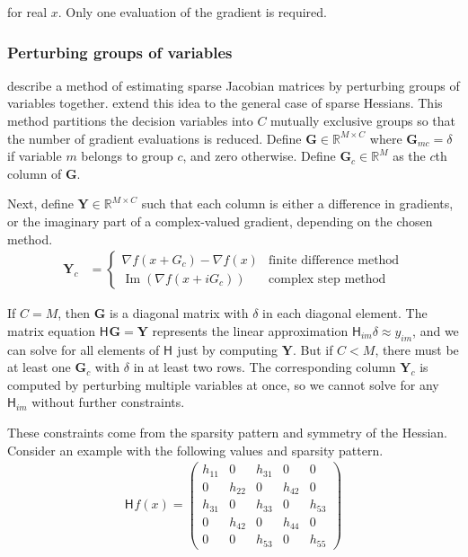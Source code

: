 \documentclass[jss]{jss}\usepackage[]{graphicx}\usepackage[]{color}
\newcommand{\hess}[2]{\mathsf{H}_{#1}#2}
\newcommand{\Mat}[1]{\mathbf{#1}}
\newcommand{\Real}[1]{\mathbb{R}^{#1}}
\DeclareMathOperator{\Imag}{Im}
\begin{document}
for real $x$.  Only one evaluation of the gradient is required.

\subsubsection[Perturbing groups of variables]{Perturbing groups of variables}

 describe a method of estimating sparse
Jacobian matrices by perturbing groups of variables together.
 extend this idea to the
general case of sparse Hessians.  This method partitions
the decision variables into $C$ mutually exclusive groups so that the number of gradient
evaluations is reduced.  Define $\Mat{G}\in\Real{M\times C}$ where $\Mat{G}_{mc}=\delta$ if variable $m$ belongs to group $c$, and zero
otherwise.  Define $\Mat{G}_c\in\Real{M}$ as the $c$th column of $\Mat{G}$.

Next, define $\Mat{Y}\in\Real{M\times C}$ such that each column is
either a difference in gradients, or the imaginary part of a
complex-valued gradient, depending on the chosen method.
\begin{align}
  \label{eq:Yg}
  \Mat{Y}_c&=
           \begin{cases}  
             \nabla f(x+G_c)-\nabla f(x)&\text{finite difference method}\\
             \Imag(\nabla f(x+iG_c))&\text{complex step method}
             \end{cases}
\end{align}

If $C=M$, then $\Mat{G}$ is a diagonal matrix with $\delta$ in each
diagonal element.  The matrix equation $\hess{}{}\Mat{G}=\Mat{Y}$ represents the linear approximation
$\hess{im}{}\delta\approx y_{im}$, and we can solve for all elements of $\hess{}{}$
just by computing $\Mat{Y}$. But if $C<M$,
there must be at least one $\Mat{G}_c$ with $\delta$ in at least two
rows. The corresponding column $\Mat{Y}_c$ is computed by perturbing multiple variables at
once, so we cannot solve for any $\hess{im}{}$
without further constraints.

These constraints come from the sparsity pattern and symmetry
of the Hessian. Consider an example with the following values and
sparsity pattern.
\begin{align}
  \label{eq:7}
 \hess{}{f(x)}= \begin{pmatrix}
    h_{11}&0&h_{31}&0&0\\
    0&h_{22}&0&h_{42}&0\\
    h_{31}&0&h_{33}&0&h_{53}\\
    0&h_{42}&0&h_{44}&0\\
    0&0&h_{53}&0&h_{55}
  \end{pmatrix}
\end{align}
\end{document}
